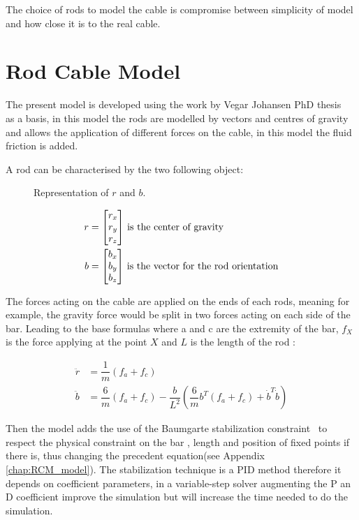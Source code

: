 The choice of rods to model the cable is compromise between simplicity of model and how close it is to the real cable.

\section{Rod Cable Model}

The present model is developed using the work by Vegar Johansen PhD thesis~\cite{johansen2007modelling} as a basis, in this model the rods are modelled by vectors and centres of gravity and allows the application of different forces on the cable, in this model the fluid friction is added.

A rod can be characterised by the two following object:

\begin{figure}[H]
\centering
{} %
{

}
\caption{Representation of $r$ and $b$.}
\label{fig:draw_ref_rb}
\end{figure}

\begin{align}
r &= \begin{bmatrix}
    r_x \\
    r_y \\
    r_z
\end{bmatrix}\, \textnormal{is the center of gravity}\\
b &= \begin{bmatrix}
    b_x \\
    b_y \\
    b_z
\end{bmatrix}\, \textnormal{is the vector for the rod orientation}
\end{align}

The forces acting on the cable are applied on the ends of each rods, meaning for example, the gravity force would be split in two forces acting on each side of the bar. Leading to the base formulas where a and c are the extremity of the bar, $f_X$ is the force applying at the point $X$ and $L$ is the length of the rod :

\begin{align}
\ddot{r} &= \dfrac{1}{m}  (f_a+f_c) \\
\ddot{b} &=  \dfrac{6}{m}(f_a+f_c) - \dfrac{b}{L^{2}}  (\dfrac{6}{m}b^{T}(f_a+f_c)+\dot{b}^{T}\dot{b}) 
\end{align}



Then the model adds the use of the Baumgarte stabilization constraint~\cite{baumgarte1972stabilization} to respect the physical constraint on the bar , length and position of fixed points if there is, thus changing the precedent equation(see Appendix \ref{chap:RCM_model}). 
The stabilization technique is a PID method therefore it depends on coefficient parameters, in a variable-step solver augmenting the P an D coefficient improve the simulation but will increase the time needed to do the simulation.

